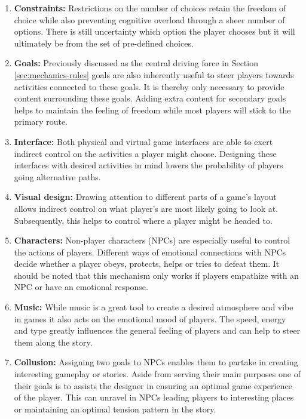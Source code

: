 \begin{enumerate}
    \item \textbf{Constraints:} Restrictions on the number of choices retain the freedom of choice while also preventing cognitive overload through a sheer number of options. There is still uncertainty which option the player chooses but it will ultimately be from the set of pre-defined choices.
    \item \textbf{Goals:} Previously discussed as the central driving force in Section \ref{sec:mechanics-rules} goals are also inherently useful to steer players towards activities connected to these goals. It is thereby only necessary to provide content surrounding these goals. Adding extra content for secondary goals helps to maintain the feeling of freedom while most players will stick to the primary route.
    \item \textbf{Interface:} Both physical and virtual game interfaces are able to exert indirect control on the activities a player might choose. Designing these interfaces with desired activities in mind lowers the probability of players going alternative paths.
    \item \textbf{Visual design:} Drawing attention to different parts of a game's layout allows indirect control on what player's are most likely going to look at. Subsequently, this helps to control where a player might be headed to.
    \item \textbf{Characters:} Non-player characters (NPCs) are especially useful to control the actions of players. Different ways of emotional connections with NPCs decide whether a player obeys, protects, helps or tries to defeat them. It should be noted that this mechanism only works if players empathize with an NPC or have an emotional response.
    \item \textbf{Music:} While music is a great tool to create a desired atmosphere and vibe in games it also acts on the emotional mood of players. The speed, energy and type greatly influences the general feeling of players and can help to steer them along the story.
    \item \textbf{Collusion:} Assigning two goals to NPCs enables them to partake in creating interesting gameplay or stories. Aside from serving their main purposes one of their goals is to assists the designer in ensuring an optimal game experience of the player. This can unravel in NPCs leading players to interesting places or maintaining an optimal tension pattern in the story.
\end{enumerate}